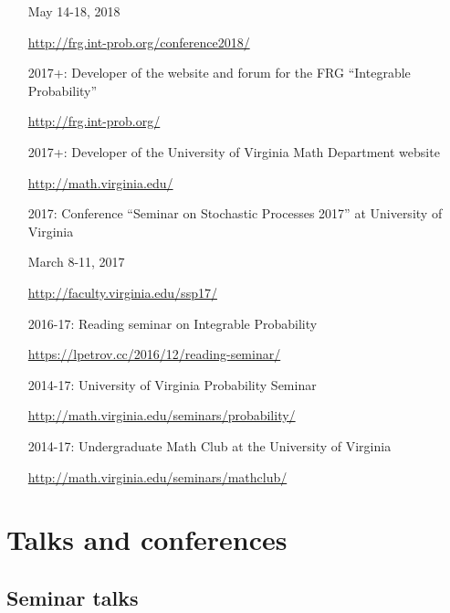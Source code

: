 \documentclass[letterpaper,11pt]{article}
\begin{document}
\begin{itemize}
		May 14-18, 2018
	
		\url{http://frg.int-prob.org/conference2018/}


	\item [2017+:]
		Developer of the website and forum for the FRG ``Integrable Probability''

		\url{http://frg.int-prob.org/}

	\item [2017+:]
		Developer of the University of Virginia Math Department website

		\url{http://math.virginia.edu/}
	\item
	      [2017:] Conference
	      ``Seminar on Stochastic Processes 2017'' at University of
		Virginia
		
		March 8-11, 2017

	      \url{http://faculty.virginia.edu/ssp17/}
	\item
	      [2016-17:]
	      Reading seminar on Integrable Probability

	      \url{https://lpetrov.cc/2016/12/reading-seminar/}
	\item
	      [2014-17:] University of Virginia Probability Seminar

	      \url{http://math.virginia.edu/seminars/probability/}
	\item
	      [2014-17:]
	      Undergraduate Math Club at the University of Virginia

	      \url{http://math.virginia.edu/seminars/mathclub/}
\end{itemize}

\section*{Talks and conferences}

\subsection*{Seminar talks}
\end{document}
